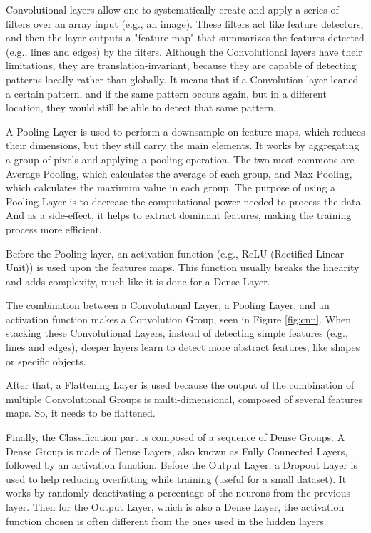 \documentclass[../main.tex]{subfile}
\begin{document}
Convolutional layers allow one to systematically create and apply a series of filters over an array input (e.g., an image). These filters act like feature detectors, and then the layer outputs a "feature map" that summarizes the features detected (e.g., lines and edges) by the filters. Although the Convolutional layers have their limitations, they are translation-invariant, because they are capable of detecting patterns locally rather than globally. It means that if a Convolution layer leaned a certain pattern, and if the same pattern occurs again, but in a different location, they would still be able to detect that same pattern.

A Pooling Layer is used to perform a downsample on feature maps, which reduces their dimensions, but they still carry the main elements. It works by aggregating a group of pixels and applying a pooling operation. The two most commons are Average Pooling, which calculates the average of each group, and Max Pooling, which calculates the maximum value in each group. The purpose of using a Pooling Layer is to decrease the computational power needed to process the data. And as a side-effect, it helps to extract dominant features, making the training process more efficient.

Before the Pooling layer, an activation function (e.g., ReLU (Rectified Linear Unit)) is used upon the features maps. This function usually breaks the linearity and adds complexity, much like it is done for a Dense Layer.

The combination between a Convolutional Layer, a Pooling Layer, and an activation function makes a Convolution Group, seen in Figure \ref{fig:cnn}. When stacking these Convolutional Layers, instead of detecting simple features (e.g., lines and edges), deeper layers learn to detect more abstract features, like shapes or specific objects.

After that, a Flattening Layer is used because the output of the combination of multiple Convolutional Groups is multi-dimensional, composed of several features maps. So, it needs to be flattened.

Finally, the Classification part is composed of a sequence of Dense Groups. A Dense Group is made of Dense Layers, also known as Fully Connected Layers, followed by an activation function. Before the Output Layer, a Dropout Layer is used to help reducing overfitting while training (useful for a small dataset). It works by randomly deactivating a percentage of the neurons from the previous layer. Then for the Output Layer, which is also a Dense Layer, the activation function chosen is often different from the ones used in the hidden layers.
\end{document}
